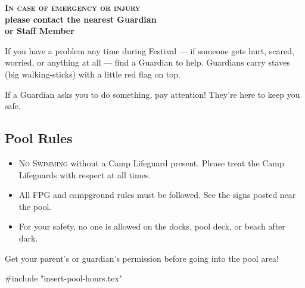 \documentclass[9pt,twoside,openright,final,article,letterpaper]{memoir}
\renewcommand{\pfbreakdisplay}{%
  \needspace{24pt}%
  \vspace{8pt}\\\ding{76}\quad\ding{77}\quad\ding{78}\\%
  \vspace{11pt}}
\let\oldsubsection=\subsection
\renewcommand{\subsection}[1]{%
  \vspace{6pt}
  \needspace{1.25in}
  \oldsubsection{#1}
  \nopagebreak}
\let\oldsubsubsection=\subsubsection
\renewcommand{\subsubsection}[1]{%
  \needspace{.75in}
  \oldsubsubsection{#1}
  \nopagebreak}
\begin{document}
\begin{multicols}{3}

  \begin{center}
    \textbf{\large \textsc{In case of emergency or injury} \\ please contact the
      nearest Guardian \\ or Staff Member}
  \end{center}

  If you have a problem any time during Festival --- if someone gets
  hurt, scared, worried, or anything at all --- find a Guardian
  to help. Guardians carry staves (big walking-sticks) with a little red
  flag on top.

  If a Guardian asks you to do something, pay attention! They're here to
  keep you safe.


  \subsection{Pool Rules}

  \begin{itemize}
  \item \textsc{No Swimming} without a Camp Lifeguard present.
    Please treat the Camp Lifeguards with respect at all times.
  \item All FPG and campground rules must be followed. See the signs
    posted near the pool.
  \item For your safety, no one is allowed on the docks, pool deck,
    or beach after dark.
  \end{itemize}

  Get your parent's or guardian's permission before going into the pool area!


  #include "insert-pool-hours.tex"

\end{multicols}

\vfill
\pagestyle{headings}
\thispagestyle{headings}
\end{document}
